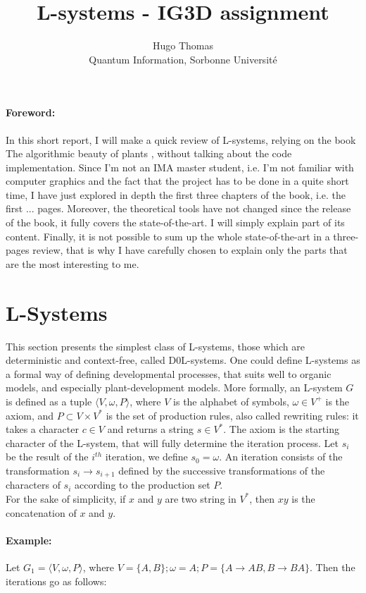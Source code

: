 \documentclass[10pt, letterpaper, twoside]{article}
\title{\Large L-systems - IG3D assignment}
\author{\Large Hugo Thomas\\ \small Quantum Information, Sorbonne Université}
\makeatletter
\renewcommand{\maketitle}{\bgroup\setlength{\parindent}{0pt}
\begin{flushleft}
  \textbf{\@title}

  \@author
\end{flushleft}\egroup
}
\makeatother
\begin{document}
\maketitle

\begin{multicols}{2}

\paragraph{Foreword:}In this short report, I will make a quick review of
L-systems, relying on the book The algorithmic beauty of plants \cite{TheAB},
without talking about the code implementation. Since I'm not an IMA master
student, i.e. I'm not familiar with computer graphics and the fact that the
project has to be done in a quite short time, I have just explored in depth the
first three chapters of the book, i.e. the first ...  pages. Moreover, the
theoretical tools have not changed since the release of the book, it fully
covers the state-of-the-art. I will simply explain part of its content. Finally,
it is not possible to sum up the whole state-of-the-art in a three-pages review,
that is why I have carefully chosen to explain only the parts that are the most
interesting to me.

\section*{L-Systems}
This section presents the simplest class of L-systems, those which are
deterministic and context-free, called D0L-systems. One could define L-systems
as a formal way of defining developmental processes, that suits well to organic
models, and especially plant-development models. More formally, an L-system $G$ is
defined as a tuple $\langle V, \omega, P \rangle$, where $V$ is the alphabet of
symbols, $\omega \in V^+$ is the axiom, and $P \subset V \times V^*$ is the set
of production rules, also called rewriting rules: it takes a character $c \in V$
and returns a string $s \in V^*$. The axiom is the starting character of the
L-system, that will fully determine the iteration process. Let $s_i$ be the
result of the $i^{th}$ iteration, we define $s_0 = \omega$. An iteration
consists of the transformation $s_i \rightarrow s_{i+1}$ defined by the
successive transformations of the characters of $s_i$ according to the
production set $P$. \\\noindent For the sake of simplicity, if $x$ and $y$ are
two string in $V^*$, then $xy$ is the concatenation of $x$ and $y$.
\paragraph*{Example:}
Let $G_1 = \langle V, \omega, P \rangle$, where $V = \{A,B\}; \omega = A; P =
\{A\rightarrow AB, B\rightarrow BA\}$. Then the iterations go as follows:


\end{multicols}
\end{document}
